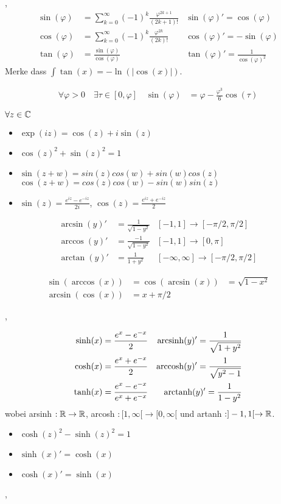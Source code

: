 \sep
{}
\begin{align*}
\sin(\varphi)  
& =\sum_{k=0}^{\infty} (-1)^k \frac{\varphi^{2k+1}}{(2k+1)!} &\sin(\varphi)' = \cos(\varphi)  \\
\cos(\varphi)  
& = \sum_{k=0}^{\infty} (-1)^k \frac{\varphi^{2k}}{(2k)!} &\cos(\varphi)' = -\sin(\varphi) \\
\tan(\varphi)  
& = \frac{\sin(\varphi)}{\cos(\varphi)} & \tan(\varphi)' = \frac{1}{\cos(\varphi)^2} 
\end{align*}
Merke dass $\int \tan(x) = -\ln(|\cos(x)|)$.

\Korollar 
\begin{align*}
\forall \varphi > 0 \quad \exists \tau \in[0, \varphi] \quad \sin(\varphi) &= \varphi - \frac{\varphi^3}{6}\cos(\tau)
\end{align*}

\Satz $\forall z \in \mathbb{C}$ 
\begin{itemize}
	\item $\exp(iz) = \cos(z) + i\sin(z)$
	\item $\cos(z)^2 + \sin(z)^2 = 1$
	\item $\sin(z+w) = sin(z)cos(w) + sin(w)cos(z)$ \\
		  $\cos(z+w) = cos(z)cos(w) - sin(w)sin(z)$ 
	\item $\sin(z) = \frac{e^{iz}-e^{-iz}}{2i}$, $\cos(z) = \frac{e^{iz}+e^{-iz}}{2}$
\end{itemize}
\Lemma
\begin{align*}
\arcsin(y)'  &= \frac{1}{\sqrt{1-y^2}}  &[-1,1] \longrightarrow [-\pi/2, \pi/2]  \\
\arccos(y)'  &= \frac{-1}{\sqrt{1-y^2}}  &[-1,1] \longrightarrow [0, \pi]  \\
\arctan(y)'  &= \frac{1}{1+y^2}  &[-\infty,\infty] \longrightarrow [-\pi/2, \pi/2]  
\end{align*}

\Lemma
\begin{align*}
\sin(\arccos(x))  &= \cos(\arcsin(x)) &= \sqrt{1-x^2} \\
\arcsin(\cos(x)) &= x + \pi/2 
\end{align*}

\sep

\begin{align*}
\sinh(x)  & =\frac{e^{x}-e^{-x}}{2} &\operatorname{arcsinh}(y)' = \frac{1}{\sqrt{1+y^2}}  \\
\cosh(x)  & =\frac{e^{x}+e^{-x}}{2} &\operatorname{arccosh}(y)' =  \frac{1}{\sqrt{y^2-1}} \\
\tanh(x)  & =\frac{e^{x}-e^{-x}}{e^{x}+e^{-x}} & \operatorname{arctanh}(y)' = \frac{1}{1-y^2}
\end{align*}
wobei arsinh $ : \mathbb{R} \rightarrow \mathbb{R}$, arcosh $ : [1,\infty[ \rightarrow [0,\infty[$ und artanh $: ]-1,1[ \rightarrow \mathbb{R}$.
\begin{itemize}
	\item $\cosh(z)^2 - \sinh(z)^2 = 1$
	\item $\sinh(x)' = \cosh(x)$
	\item $\cosh(x)' = \sinh(x)$
\end{itemize}
\sep

